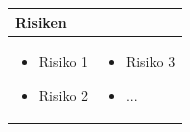 \begin{table}[h]
\begin{tabular}{p{}p{}}


 \textbf{Risiken} & \\ \hline
	 
\begin{itemize}
\item Risiko 1
\item Risiko 2
\end{itemize}
&
\begin{itemize}
\item Risiko 3
\item ...
\end{itemize}

 
\end{tabular}
\end{table}

\pagebreak